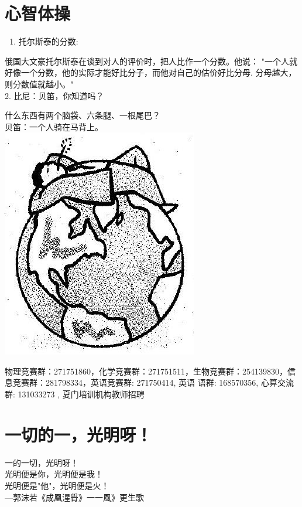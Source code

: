 \documentclass[10pt]{article}
\begin{document}
\section*{心智体操}
\begin{enumerate}
  \item 托尔斯泰的分数:
\end{enumerate}

俄国大文豪托尔斯泰在谈到对人的评价时，把人比作一个分数。他说： "一个人就好像一个分数，他的实际才能好比分子，而他对自己的估价好比分母. 分母越大，则分数值就越小。"\\
2. 比尼：贝笛，你知道吗？

什么东西有两个脑袋、六条腿、一根尾巴？\\
贝笛：一个人骑在马背上。\\
\includegraphics[max width=\textwidth, center]{2024_10_30_26b590fd1106d28139f0g-040}

物理竞赛群：271751860，化学竞赛群：271751511，生物竞赛群：254139830，信息竞赛群：281798334，英语竞赛群: 271750414, 英语 语群: 168570356, 心算交流群: 131033273 , 夏门培训机构教师招聘

\section*{一切的一，光明呀！}
一的一切，光明呀！\\
光明便是你，光明便是我！\\
光明便是"他"，光明便是火！\\
—郭沫若《成凰湦䑁》一一風》更生歌
\end{document}
